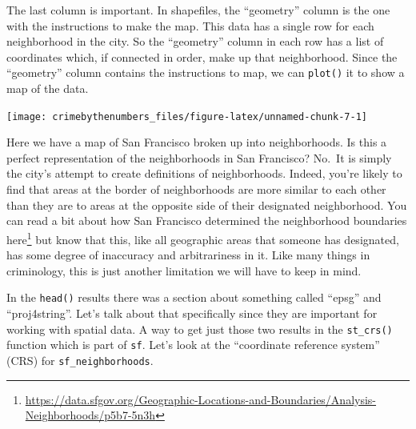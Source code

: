 \documentclass[
]{krantz}
\makeatletter
\newenvironment{Shaded}{\begin{snugshade}}{\end{snugshade}}
\newcommand{\FunctionTok}[1]{\textcolor[rgb]{0,0,0}{#1}}
\newcommand{\NormalTok}[1]{#1}
\newcommand{\SpecialCharTok}[1]{\textcolor[rgb]{0,0,0}{#1}}
\renewcommand{\href}[2]{#2\footnote{\url{#1}}}
\newenvironment{kframe}{%
\medskip{}
\setlength{\fboxsep}{.8em}
 \def\at@end@of@kframe{}%
 \ifinner\ifhmode%
  \def\at@end@of@kframe{\end{minipage}}%
  \begin{minipage}{\columnwidth}%
 \fi\fi%
 \def\FrameCommand##1{\hskip\@totalleftmargin \hskip-\fboxsep
 \colorbox{shadecolor}{##1}\hskip-\fboxsep
     \hskip-\linewidth \hskip-\@totalleftmargin \hskip\columnwidth}%
 \MakeFramed {\advance\hsize-\width
   \@totalleftmargin\z@ \linewidth\hsize
   \@setminipage}}%
 {\par\unskip\endMakeFramed%
 \at@end@of@kframe}
\renewenvironment{Shaded}{\begin{kframe}}{\end{kframe}}
\makeatother
\begin{document}
The last column is important. In shapefiles, the ``geometry'' column is the one with the instructions to make the map. This data has a single row for each neighborhood in the city. So the ``geometry'' column in each row has a list of coordinates which, if connected in order, make up that neighborhood. Since the ``geometry'' column contains the instructions to map, we can \texttt{plot()} it to show a map of the data.

\begin{Shaded}
\end{Shaded}

\begin{center}\texttt{[image: crimebythenumbers\_files/figure-latex/unnamed-chunk-7-1]} \end{center}

Here we have a map of San Francisco broken up into neighborhoods. Is this a perfect representation of the neighborhoods in San Francisco? No.~It is simply the city's attempt to create definitions of neighborhoods. Indeed, you're likely to find that areas at the border of neighborhoods are more similar to each other than they are to areas at the opposite side of their designated neighborhood. You can read a bit about how San Francisco determined the neighborhood boundaries \href{https://data.sfgov.org/Geographic-Locations-and-Boundaries/Analysis-Neighborhoods/p5b7-5n3h}{here} but know that this, like all geographic areas that someone has designated, has some degree of inaccuracy and arbitrariness in it. Like many things in criminology, this is just another limitation we will have to keep in mind.

In the \texttt{head()} results there was a section about something called ``epsg'' and ``proj4string''. Let's talk about that specifically since they are important for working with spatial data. A way to get just those two results in the \texttt{st\_crs()} function which is part of \texttt{sf}. Let's look at the ``coordinate reference system'' (CRS) for \texttt{sf\_neighborhoods}.
\end{document}
